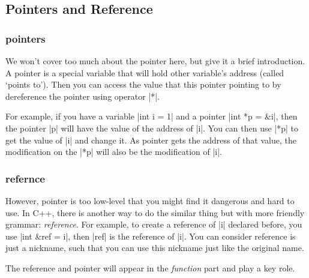 \documentclass[compress,xcolor={dvipsnames}]{beamer}
\begin{document}
\subsection{Pointers and Reference}
\begin{frame}[fragile]
    \frametitle{pointers}

    We won't cover too much about the pointer here, but give it a brief introduction. A pointer is a
    special variable that will hold other variable's address (called `points to'). Then you can access the value that this pointer pointing to by dereference the pointer using operator \cverb|*|.

    For example, if you have a variable \cverb|int i = 1| and a pointer \cverb|int *p = &i|, then the pointer \cverb|p| will have the value of the address of \cverb|i|. You can then use \cverb|*p| to get the value of \cverb|i| and change it. As pointer gets the address of that value, the modification on the \cverb|*p| will also be the modification of \cverb|i|.

\end{frame}

\begin{frame}[fragile]
    \frametitle{refernce}

    However, pointer is too low-level that you might find it dangerous and hard to use. In C++, there is another way to do the similar thing but with more friendly grammar: \emph{reference}. For example, to create a reference of \cverb|i| declared before, you use \cverb|int &ref = i|, then \cverb|ref| is the reference of \cverb|i|. You can consider reference is just a nickname, such that you can use this nickname just like the original name.

    The reference and pointer will appear in the \emph{function} part and play a key role.

\end{frame}
\end{document}

